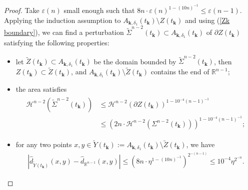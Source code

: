 \documentclass[letter]{amsart}
\theoremstyle{definition}
\theoremstyle{remark}
\begin{document}
\begin{proof}
Take $\varepsilon (n)$ small enough such that $8n\cdot \varepsilon (n)^{1- (10n)^{-1}} \leq \varepsilon (n-1)$. 
Applying the induction assumption to $A_{\mathbf{k}, \delta _1}(t_{\mathbf{k}}) \setminus Z(t_{\mathbf{k}})$ and using (\ref{Zk boundary}), 
we can find a perturbation $\tilde{\Sigma }^{n-2}(t_{\mathbf{k}}) \subset A_{\mathbf{k}, \delta _1}(t_{\mathbf{k}})$ of $\partial Z(t_{\mathbf{k}}) $ satisfying the following properties: 
\begin{itemize}
	\item let $\tilde{Z}(t_{\mathbf{k}}) \subset A_{\mathbf{k}, \delta _1}(t_{\mathbf{k}})$ be the domain bounded by $\tilde{\Sigma }^{n-2}(t_{\mathbf{k}})$, then $Z(t_{\mathbf{k}}) \subset \tilde{Z}(t_{\mathbf{k}})$, and $A_{\mathbf{k}, \delta _1}(t_{\mathbf{k}}) \setminus \tilde{Z}(t_{\mathbf{k}})$ contains the end of $\mathbb{R}^{n-1}$; 
	\item the area satisfies  \begin{align}\label{area-ind-n}
			\begin{split}
				\mathcal{H}^{n-2}(\tilde{\Sigma }^{n-2}(t_{\mathbf{k}}) )& \leq \mathcal{H}^{n-2}(\partial Z(t_{\mathbf{k}}) ) ^{1- 10^{-4}(n-1)^{-1}}\\
	&\leq ( 2 n \cdot \mathcal{H}^{n-2}( \Sigma ^{n-2}(t_{\mathbf{k}}) ) )^{1- 10^{-4}(n-1)^{-1}};
\end{split}
\end{align}
\item for any two points $x, y \in \tilde{Y}(t_{\mathbf{k}}):= A_{\mathbf{k}, \delta _1}(t_{\mathbf{k}}) \setminus \tilde{Z}(t_{\mathbf{k}})$, we have
	\begin{align}\label{Y-tld}
	|\hat{d}_{\tilde{Y}(t_{\mathbf{k}})}(x,y) - \hat{d}_{\mathbb{R}^{n-1}}(x,y) | \leq (8n \cdot \eta ^{1- (10n)^{-1}})^{2^{-(n-1)}} \leq 10^{-4} \eta ^{2^{-n}}.
\end{align}



\end{itemize}
\end{proof}
\end{document}
